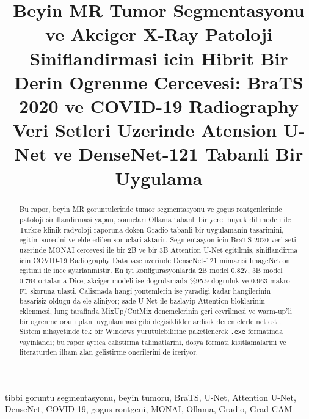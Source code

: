 \documentclass[conference]{IEEEtran}
\begin{document}
\title{Beyin MR Tumor Segmentasyonu ve Akciger X-Ray Patoloji Siniflandirmasi
icin Hibrit Bir Derin Ogrenme Cercevesi: BraTS 2020 ve COVID-19 Radiography
Veri Setleri Uzerinde Atension U-Net ve DenseNet-121 Tabanli Bir Uygulama}

\author{
}

\maketitle

\begin{abstract}
Bu rapor, beyin MR goruntulerinde tumor segmentasyonu ve gogus rontgenlerinde
patoloji siniflandirmasi yapan, sonuclari Ollama tabanli bir yerel buyuk dil
modeli ile Turkce klinik radyoloji raporuna doken Gradio tabanli bir
uygulamanin tasarimini, egitim surecini ve elde edilen sonuclari aktarir.
Segmentasyon icin BraTS 2020 veri seti uzerinde MONAI cercevesi ile bir 2B ve
bir 3B Attention U-Net egitilmis, siniflandirma icin COVID-19 Radiography
Database uzerinde DenseNet-121 mimarisi ImageNet on egitimi ile ince
ayarlanmistir. En iyi konfigurasyonlarda 2B model 0.827, 3B model 0.764
ortalama Dice; akciger modeli ise dogrulamada \%95.9 dogruluk ve 0.963 makro
F1 skoruna ulasti. Calismada hangi yontemlerin ise yaradigi kadar hangilerinin
basarisiz oldugu da ele aliniyor; sade U-Net ile baslayip Attention bloklarinin
eklenmesi, lung tarafinda MixUp/CutMix denemelerinin geri cevrilmesi ve
warm-up'li bir ogrenme orani plani uygulanmasi gibi degisiklikler ardisik
denemelerle netlesti. Sistem nihayetinde tek bir Windows yurutulebilirine
paketlenerek \texttt{.exe} formatinda yayinlandi; bu rapor ayrica calistirma
talimatlarini, dosya formati kisitlamalarini ve literaturden ilham alan
gelistirme onerilerini de iceriyor.
\end{abstract}

\begin{IEEEkeywords}
tibbi goruntu segmentasyonu, beyin tumoru, BraTS, U-Net, Attention U-Net,
DenseNet, COVID-19, gogus rontgeni, MONAI, Ollama, Gradio, Grad-CAM
\end{IEEEkeywords}
\end{document}
